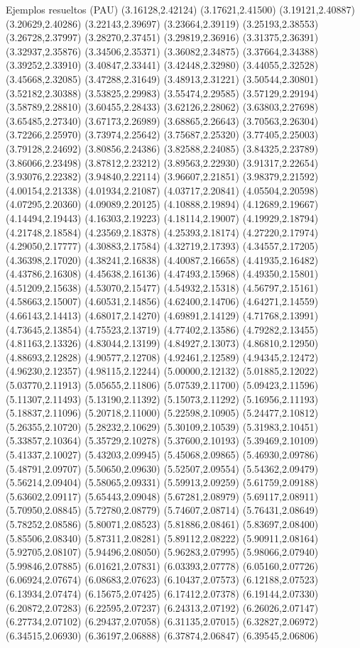 \documentclass[11pt,a4paper]{article}
\begin{document}
\begin{fmex}{Ejemplos resueltos (PAU)}
(3.16128,2.42124) (3.17621,2.41500) (3.19121,2.40887) (3.20629,2.40286) (3.22143,2.39697) (3.23664,2.39119) (3.25193,2.38553) (3.26728,2.37997) (3.28270,2.37451) (3.29819,2.36916) (3.31375,2.36391) (3.32937,2.35876) (3.34506,2.35371) (3.36082,2.34875) (3.37664,2.34388) (3.39252,2.33910) (3.40847,2.33441) (3.42448,2.32980) (3.44055,2.32528) (3.45668,2.32085) (3.47288,2.31649) (3.48913,2.31221) (3.50544,2.30801) (3.52182,2.30388) (3.53825,2.29983) (3.55474,2.29585) (3.57129,2.29194) (3.58789,2.28810) (3.60455,2.28433) (3.62126,2.28062) (3.63803,2.27698) (3.65485,2.27340) (3.67173,2.26989) (3.68865,2.26643) (3.70563,2.26304) (3.72266,2.25970) (3.73974,2.25642) (3.75687,2.25320) (3.77405,2.25003) (3.79128,2.24692) (3.80856,2.24386) (3.82588,2.24085) (3.84325,2.23789) (3.86066,2.23498) (3.87812,2.23212) (3.89563,2.22930) (3.91317,2.22654) (3.93076,2.22382) (3.94840,2.22114) (3.96607,2.21851) (3.98379,2.21592) (4.00154,2.21338) (4.01934,2.21087) (4.03717,2.20841) (4.05504,2.20598) (4.07295,2.20360) (4.09089,2.20125) (4.10888,2.19894) (4.12689,2.19667) (4.14494,2.19443) (4.16303,2.19223) (4.18114,2.19007) (4.19929,2.18794) (4.21748,2.18584) (4.23569,2.18378) (4.25393,2.18174) (4.27220,2.17974) (4.29050,2.17777) (4.30883,2.17584) (4.32719,2.17393) (4.34557,2.17205) (4.36398,2.17020) (4.38241,2.16838) (4.40087,2.16658) (4.41935,2.16482) (4.43786,2.16308) (4.45638,2.16136) (4.47493,2.15968) (4.49350,2.15801) (4.51209,2.15638) (4.53070,2.15477) (4.54932,2.15318) (4.56797,2.15161) (4.58663,2.15007) (4.60531,2.14856) (4.62400,2.14706) (4.64271,2.14559) (4.66143,2.14413) (4.68017,2.14270) (4.69891,2.14129) (4.71768,2.13991) (4.73645,2.13854) (4.75523,2.13719) (4.77402,2.13586) (4.79282,2.13455) (4.81163,2.13326) (4.83044,2.13199) (4.84927,2.13073) (4.86810,2.12950) (4.88693,2.12828) (4.90577,2.12708) (4.92461,2.12589) (4.94345,2.12472) (4.96230,2.12357) (4.98115,2.12244) (5.00000,2.12132) (5.01885,2.12022) (5.03770,2.11913) (5.05655,2.11806) (5.07539,2.11700) (5.09423,2.11596) (5.11307,2.11493) (5.13190,2.11392) (5.15073,2.11292) (5.16956,2.11193) (5.18837,2.11096) (5.20718,2.11000) (5.22598,2.10905) (5.24477,2.10812) (5.26355,2.10720) (5.28232,2.10629) (5.30109,2.10539) (5.31983,2.10451) (5.33857,2.10364) (5.35729,2.10278) (5.37600,2.10193) (5.39469,2.10109) (5.41337,2.10027) (5.43203,2.09945) (5.45068,2.09865) (5.46930,2.09786) (5.48791,2.09707) (5.50650,2.09630) (5.52507,2.09554) (5.54362,2.09479) (5.56214,2.09404) (5.58065,2.09331) (5.59913,2.09259) (5.61759,2.09188) (5.63602,2.09117) (5.65443,2.09048) (5.67281,2.08979) (5.69117,2.08911) (5.70950,2.08845) (5.72780,2.08779) (5.74607,2.08714) (5.76431,2.08649) (5.78252,2.08586) (5.80071,2.08523) (5.81886,2.08461) (5.83697,2.08400) (5.85506,2.08340) (5.87311,2.08281) (5.89112,2.08222) (5.90911,2.08164) (5.92705,2.08107) (5.94496,2.08050) (5.96283,2.07995) (5.98066,2.07940) (5.99846,2.07885) (6.01621,2.07831) (6.03393,2.07778) (6.05160,2.07726) (6.06924,2.07674) (6.08683,2.07623) (6.10437,2.07573) (6.12188,2.07523) (6.13934,2.07474) (6.15675,2.07425) (6.17412,2.07378) (6.19144,2.07330) (6.20872,2.07283) (6.22595,2.07237) (6.24313,2.07192) (6.26026,2.07147) (6.27734,2.07102) (6.29437,2.07058) (6.31135,2.07015) (6.32827,2.06972) (6.34515,2.06930) (6.36197,2.06888) (6.37874,2.06847) (6.39545,2.06806) 
\end{fmex}
\end{document}
